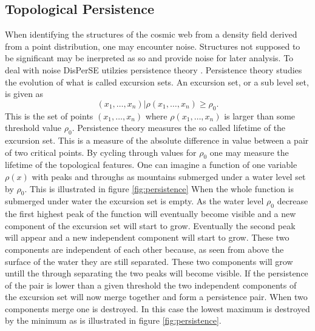 \subsection{Topological Persistence}\label{sec:persistence}
When identifying the structures of the cosmic web from a density field derived
from a point distribution, one may
encounter noise. Structures not supposed to be significant may be inerpreted as
so and provide noise for later analysis. To deal with noise DisPerSE utilzies
persistence theory \cite{persistence}. Persistence theory studies the evolution
of what is called excursion sets. An excursion set, or a sub level set, is given as
\begin{equation}
    (x_1,\dots, x_n)\vert\rho(x_1,\dots, x_n)\geq\rho_0.
\end{equation}
This is the set of points $(x_1,\dots, x_n)$ where $\rho(x_1,\dots, x_n)$ is
larger than some threshold value $\rho_0$. Persistence theory measures the so
called lifetime of the excursion set. This is a measure of the absolute
difference in value between a pair of two critical points. By cycling through
values for $\rho_0$ one may measure the lifetime of the topological features.
One can imagine a function of one variable $\rho(x)$ with peaks and throughs as
mountains submerged under a water level set by $\rho_0$. This is illustrated in
figure \ref{fig:persistence}
When the whole function is submerged under water the excursion set is empty. As
the water level $\rho_0$ decrease the first highest peak of the function will
eventually become visible and a new component of the excursion set will start to
grow. Eventually the second peak will appear and a new independent component
will start to grow. These two components are independent of each other because,
as seen from above the surface of the water they are still separated. These two
components will grow untill the through separating the two peaks will become
visible. If the persistence of the pair is lower than a given threshold the two independent components of the excursion set will now merge
together and form a persistence pair. When two components merge one is
destroyed. In this case the lowest maximum is destroyed by the minimum as is
illustrated in figure \ref{fig:persistence}.\\

